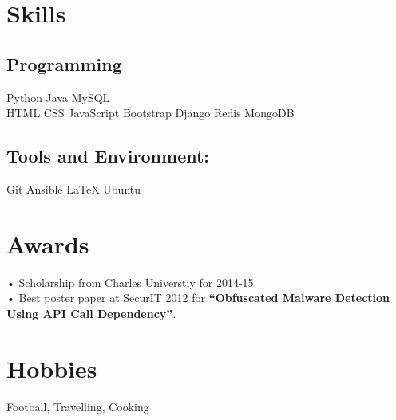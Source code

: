 \documentclass[]{deedy-resume-openfont}
\begin{document}
\begin{minipage}[t]{0.33\textwidth}
\section{Skills}
\subsection{Programming}
Python \textbullet{} Java \textbullet{} MySQL \\
HTML \textbullet{} CSS \textbullet{} JavaScript \textbullet{} Bootstrap \textbullet{} Django \textbullet{} Redis \textbullet{} MongoDB  \\
\subsection{Tools and Environment:}
Git \textbullet{} Ansible \textbullet{} LaTeX \textbullet{} Ubuntu\\
\sectionsep


\section{Awards}
• Scholarship from Charles Universtiy for 2014-15. \\
• Best poster paper at SecurIT 2012 for \textbf{“Obfuscated Malware Detection Using API Call Dependency”}.\\
\sectionsep


\section{Hobbies}
Football, Travelling, Cooking
\sectionsep

%
%

\end{minipage}
\hfill
\end{document}
